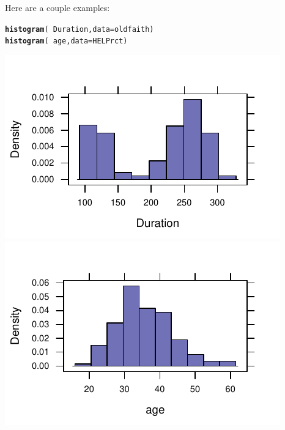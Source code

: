 \documentclass[twoside]{book}\usepackage[]{graphicx}\usepackage[]{xcolor}
\makeatletter
\def\maxwidth{ %
  \ifdim\Gin@nat@width>\linewidth
    \linewidth
  \else
    \Gin@nat@width
  \fi
}
\newcommand{\hlopt}[1]{\textcolor[rgb]{0,0,0}{#1}}%
\newcommand{\hlstd}[1]{\textcolor[rgb]{0.345,0.345,0.345}{#1}}%
\newcommand{\hlkwc}[1]{\textcolor[rgb]{0.333,0.667,0.333}{#1}}%
\newcommand{\hlkwd}[1]{\textcolor[rgb]{0.737,0.353,0.396}{\textbf{#1}}}%
\newenvironment{kframe}{%
 \def\at@end@of@kframe{}%
 \ifinner\ifhmode%
  \def\at@end@of@kframe{\end{minipage}}%
  \begin{minipage}{\columnwidth}%
 \fi\fi%
 \def\FrameCommand##1{\hskip\@totalleftmargin \hskip-\fboxsep
 \colorbox{shadecolor}{##1}\hskip-\fboxsep
     \hskip-\linewidth \hskip-\@totalleftmargin \hskip\columnwidth}%
 \MakeFramed {\advance\hsize-\width
   \@totalleftmargin\z@ \linewidth\hsize
   \@setminipage}}%
 {\par\unskip\endMakeFramed%
 \at@end@of@kframe}
\newenvironment{knitrout}{}{} %
\newcounter{example}[section]
\makeatother
\begin{document}
Here are a couple examples:
\begin{knitrout}
\color{fgcolor}\begin{kframe}
\begin{alltt}
\hlkwd{histogram}\hlstd{(}\hlopt{~}\hlstd{Duration,} \hlkwc{data} \hlstd{= oldfaith)}
\hlkwd{histogram}\hlstd{(}\hlopt{~}\hlstd{age,} \hlkwc{data} \hlstd{= HELPrct)}
\end{alltt}
\end{kframe}

{\centering \includegraphics[width=\maxwidth]{figures/fig-histogram-1} 
\includegraphics[width=\maxwidth]{figures/fig-histogram-2} 

}



\end{knitrout}
\end{document}
